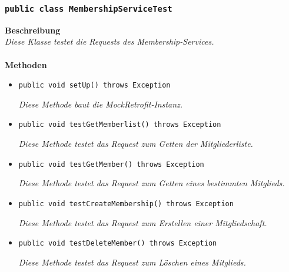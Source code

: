 \documentclass[a4paper]{scrreprt}
\begin{document}
	\subsubsection{\texttt{public class MembershipServiceTest}}
	\textbf{Beschreibung}\\
	\textit{Diese Klasse testet die Requests des Membership-Services.}\\
	\\
	\textbf{Methoden}
	\begin{itemize}
		
		
		\item\texttt{{public void setUp() throws Exception}}
		
		\textit{Diese Methode baut die MockRetrofit-Instanz.}
		
		\item\texttt{{public void testGetMemberlist() throws Exception}}
		
		\textit{Diese Methode testet das Request zum Getten der Mitgliederliste.}
		
		\item\texttt{{public void testGetMember() throws Exception}}
		
		\textit{Diese Methode testet das Request zum Getten eines bestimmten Mitglieds.}
		
		\item\texttt{{public void testCreateMembership() throws Exception}}
		
		\textit{Diese Methode testet das Request zum Erstellen einer Mitgliedschaft.}
		
		\item\texttt{{public void testDeleteMember() throws Exception}}
		
		\textit{Diese Methode testet das Request zum Löschen eines Mitglieds.}
		
	\end{itemize}
\end{document}
